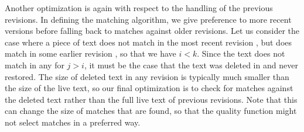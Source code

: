 Another optimization is again with respect to the handling of the
previous revisions.
In defining the matching algorithm, we give preference to more recent
versions before falling back to matches against older revisions.
Let us consider the case where a piece of text does not match in the
most recent revision ,
but does match in some earlier revision , so that we have $i < k$.
Since the text does not match in any  for $j > i$,
it must be the case that the text was deleted in  and
never restored.
The size of deleted text in any revision is typically much smaller
than the size of the live text, so our final optimization is
to check for matches against the deleted text rather than the full
live text of previous revisions.
Note that this can change the size of matches that are found,
so that the quality function might not select matches in a preferred way.

